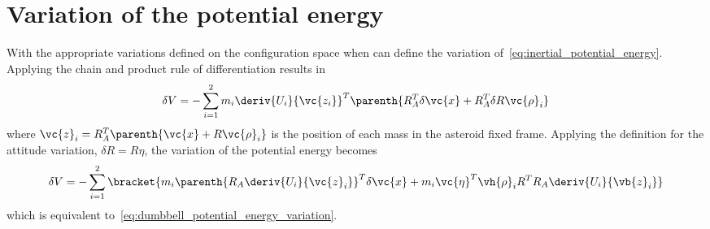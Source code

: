 \section{Variation of the potential energy}\label{sec:inertial_potential_energy_variation}
With the appropriate variations defined on the configuration space when can define the variation of~\cref{eq:inertial_potential_energy}.
Applying the chain and product rule of differentiation results in
\begin{align}
    \delta V = - \sum_{i=1}^{2} m_i \deriv{U_i}{\vc{z_i}}^T \parenth{ R_A^T \delta \vc{x} + R_A^T \delta R \vc{\rho}_i}
\end{align}
where \( \vc{z}_i = R_A^T \parenth{\vc{x} + R \vc{\rho}_i} \) is the position of each mass in the asteroid fixed frame.
Applying the definition for the attitude variation, \(\delta R = R \eta \), the variation of the potential energy becomes
\begin{align*}
    \delta V = -\sum_{i=1}^2 \bracket{ m_i \parenth{R_A \deriv{U_i}{\vc{z}_i} }^T \delta \vc{x} + m_i \vc{\eta}^T \vh{\rho}_i R^T R_A \deriv{U_i}{\vb{z}_i}}
\end{align*}
which is equivalent to~\cref{eq:dumbbell_potential_energy_variation}.
